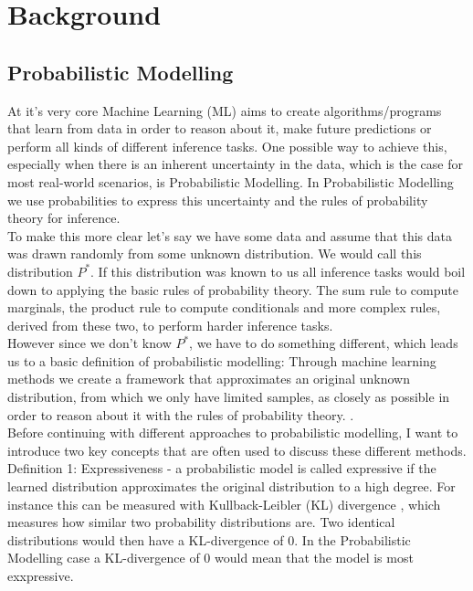 \renewcommand{\vec}[1]{\textbf{#1}}
\newcommand{\norm}[1]{\left\lVert#1\right\rVert}


\chapter{Background}
\label{cha:background}

\section{Probabilistic Modelling}
\label{sec:pm}

At it's very core Machine Learning (ML) aims to create algorithms/programs that learn from data in order to reason about it, make future
predictions or perform all kinds of different inference tasks. One possible way to achieve this, especially when there is an inherent 
uncertainty in the data, which is the case for most real-world scenarios, is Probabilistic Modelling. In Probabilistic Modelling we 
use probabilities to express this uncertainty and the rules of probability theory for inference. \\
To make this more clear let's say we have some data and assume that this data was drawn randomly from some unknown distribution. 
We would call this distribution $P^*$. If this distribution was known to us all inference tasks would boil down to applying the basic 
rules of probability theory. The sum rule to compute marginals, the product rule to compute conditionals and more complex rules, derived 
from these two, to perform harder inference tasks. \\
However since we don't know $P^*$, we have to do something different, which leads us to a basic definition of probabilistic modelling:
Through machine learning methods we create a framework that approximates an original unknown distribution, from which we only have limited samples, 
as closely as possible in order to reason about it with the rules of probability theory. \cite{pc_intro}. \\

Before continuing with different approaches to probabilistic modelling, I want to introduce two key concepts that are often 
used to discuss these different methods. \\

Definition 1: Expressiveness - a probabilistic model is called expressive if the learned distribution approximates the original distribution to a high degree.
For instance this can be measured with Kullback-Leibler (KL) divergence \cite{kl_divergence}, which measures how similar two probability distributions are. 
Two identical distributions would then have a KL-divergence of $0$. In the Probabilistic Modelling case a KL-divergence of 0 would mean that the model is most exxpressive. \\

